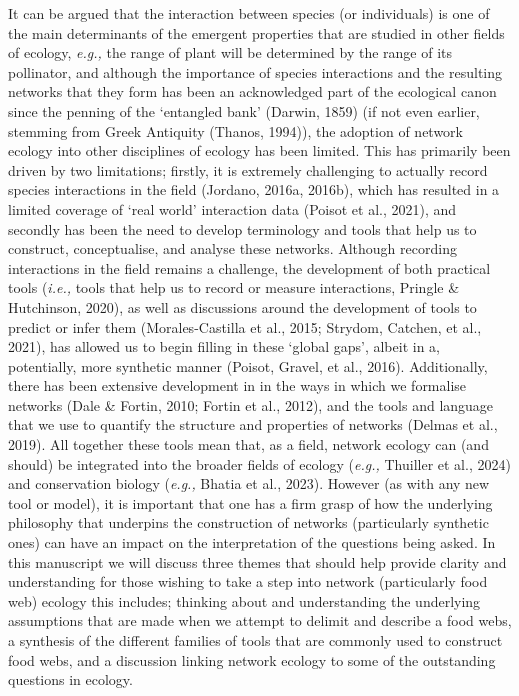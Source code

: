 \documentclass[
]{article}
\begin{document}
It can be argued that the interaction between species (or individuals)
is one of the main determinants of the emergent properties that are
studied in other fields of ecology, \emph{e.g.,} the range of plant will
be determined by the range of its pollinator, and although the
importance of species interactions and the resulting networks that they
form has been an acknowledged part of the ecological canon since the
penning of the `entangled bank' (Darwin, 1859) (if not even earlier,
stemming from Greek Antiquity (Thanos, 1994)), the adoption of network
ecology into other disciplines of ecology has been limited. This has
primarily been driven by two limitations; firstly, it is extremely
challenging to actually record species interactions in the field
(Jordano, 2016a, 2016b), which has resulted in a limited coverage of
`real world' interaction data (Poisot et al., 2021), and secondly has
been the need to develop terminology and tools that help us to
construct, conceptualise, and analyse these networks. Although recording
interactions in the field remains a challenge, the development of both
practical tools (\emph{i.e.,} tools that help us to record or measure
interactions, Pringle \& Hutchinson, 2020), as well as discussions
around the development of tools to predict or infer them
(Morales-Castilla et al., 2015; Strydom, Catchen, et al., 2021), has
allowed us to begin filling in these `global gaps', albeit in a,
potentially, more synthetic manner (Poisot, Gravel, et al., 2016).
Additionally, there has been extensive development in in the ways in
which we formalise networks (Dale \& Fortin, 2010; Fortin et al., 2012),
and the tools and language that we use to quantify the structure and
properties of networks (Delmas et al., 2019). All together these tools
mean that, as a field, network ecology can (and should) be integrated
into the broader fields of ecology (\emph{e.g.,} Thuiller et al., 2024)
and conservation biology (\emph{e.g.,} Bhatia et al., 2023). However (as
with any new tool or model), it is important that one has a firm grasp
of how the underlying philosophy that underpins the construction of
networks (particularly synthetic ones) can have an impact on the
interpretation of the questions being asked. In this manuscript we will
discuss three themes that should help provide clarity and understanding
for those wishing to take a step into network (particularly food web)
ecology this includes; thinking about and understanding the underlying
assumptions that are made when we attempt to delimit and describe a food
webs, a synthesis of the different families of tools that are commonly
used to construct food webs, and a discussion linking network ecology to
some of the outstanding questions in ecology.
\end{document}
